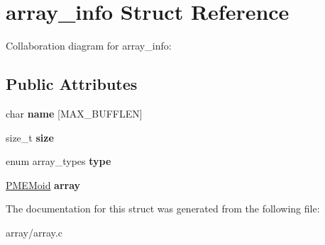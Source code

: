 \hypertarget{structarray__info}{}\section{array\+\_\+info Struct Reference}
\label{structarray__info}


Collaboration diagram for array\+\_\+info\+:
\subsection*{Public Attributes}
\begin{DoxyCompactItemize}
\item 
\mbox{\label{structarray__info_ae785f8b874daaf0bb1d8d92857f163bd}} 
char {\bfseries name} \mbox{[}M\+A\+X\+\_\+\+B\+U\+F\+F\+L\+EN\mbox{]}
\item 
\mbox{\label{structarray__info_a636917523226311ab337778e594b6dfe}} 
size\+\_\+t {\bfseries size}
\item 
\mbox{\label{structarray__info_ab7e20da6f960cb6a3066dc09b776c1e1}} 
enum array\+\_\+types {\bfseries type}
\item 
\mbox{\label{structarray__info_a9782c68cc4bcbe037d6dd94abc767a99}} 
\hyperlink{structpmemoid}{P\+M\+E\+Moid} {\bfseries array}
\end{DoxyCompactItemize}


The documentation for this struct was generated from the following file\+:\begin{DoxyCompactItemize}
\item 
array/array.\+c\end{DoxyCompactItemize}
